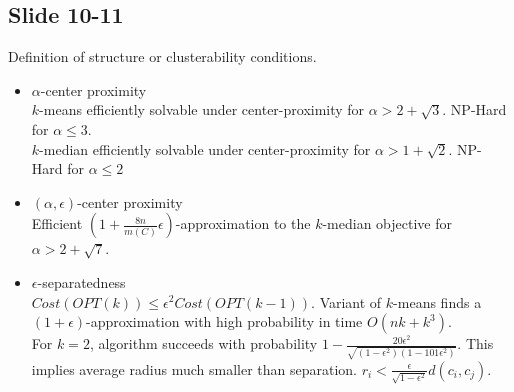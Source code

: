 \documentclass[12pt]{article}
\begin{document}
\subsection*{Slide 10-11}
Definition of structure or clusterability conditions.
	\begin{itemize}
		\item $\alpha$-center proximity\\
		$k$-means efficiently solvable under center-proximity for $\alpha > 2 + \sqrt{3}$. NP-Hard for $\alpha \le 3$.\\
		 $k$-median efficiently solvable under center-proximity for $\alpha > 1 + \sqrt{2}$. NP-Hard for $\alpha \le 2$
		 
		 \item $(\alpha, \epsilon)$-center proximity\\
		 Efficient $(1+\frac{8n}{m(C)}\epsilon)$-approximation to the $k$-median objective for $\alpha > 2 + \sqrt{7}$.
		 
		 \item $\epsilon$-separatedness\\
		 $Cost(OPT(k)) \le \epsilon^2 Cost(OPT(k-1))$. Variant of $k$-means finds a $(1+\epsilon)$-approximation with high probability in time $O(nk+k^3)$. \\
		 For $k=2$, algorithm succeeds with probability $1-\frac{20\epsilon^2}{\sqrt{(1-\epsilon^2)(1-101\epsilon^2)}}$. This implies average radius much smaller than separation.
		 $r_i < \frac{\epsilon}{\sqrt{1-\epsilon^2}} d(c_i, c_j)$.  
	\end{itemize}
\end{document}
